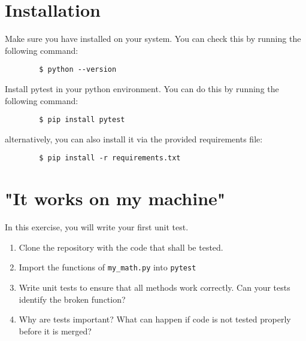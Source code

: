 \documentclass[english]{sheet}
\subtitle{Testing\textemdash PyTest}
\begin{document}
\maketitle

\section{Installation}
	Make sure you have  installed on your system. You can check this by running the following command:

	\begin{verbatim}
		$ python --version
	\end{verbatim}

	Install pytest in your python environment. You can do this by running the following command:

	\begin{verbatim}
		$ pip install pytest
	\end{verbatim}

	alternatively, you can also install it via the provided requirements file:

	\begin{verbatim}
		$ pip install -r requirements.txt
	\end{verbatim}

\section{"It works on my machine"}

\begin{exercise}
In this exercise, you will write your first unit test.
    \begin{enumerate}
        \item Clone the repository with the code that shall be tested.
		\item Import the functions of \texttt{my_math.py} into \texttt{pytest}
        \item Write unit tests to ensure that all methods work correctly. Can your tests identify the broken function?
        \item Why are tests important? What can happen if code is not tested properly before it is merged?
    \end{enumerate}
\end{exercise}
\end{document}
